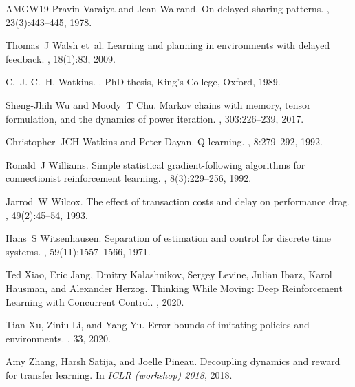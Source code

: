 \begin{thebibliography}{AMGW{\etalchar{+}}19}
Pravin Varaiya and Jean Walrand.
\newblock On delayed sharing patterns.
, 23(3):443--445, 1978.

Thomas~J Walsh et~al.
\newblock Learning and planning in environments with delayed feedback.
, 18(1):83, 2009.

C.~J. C.~H. Watkins.
.
\newblock PhD thesis, King's College, Oxford, 1989.

Sheng-Jhih Wu and Moody~T Chu.
\newblock Markov chains with memory, tensor formulation, and the dynamics of power iteration.
, 303:226--239, 2017.

Christopher~JCH Watkins and Peter Dayan.
\newblock Q-learning.
, 8:279--292, 1992.

Ronald~J Williams.
\newblock Simple statistical gradient-following algorithms for connectionist reinforcement learning.
, 8(3):229--256, 1992.

Jarrod~W Wilcox.
\newblock The effect of transaction costs and delay on performance drag.
, 49(2):45--54, 1993.

Hans~S Witsenhausen.
\newblock Separation of estimation and control for discrete time systems.
, 59(11):1557--1566, 1971.

Ted Xiao, Eric Jang, Dmitry Kalashnikov, Sergey Levine, Julian Ibarz, Karol Hausman, and Alexander Herzog.
\newblock Thinking {While} {Moving}: Deep {Reinforcement} {Learning} with {Concurrent} {Control}.
, 2020.

Tian Xu, Ziniu Li, and Yang Yu.
\newblock Error bounds of imitating policies and environments.
, 33, 2020.

Amy Zhang, Harsh Satija, and Joelle Pineau.
\newblock Decoupling dynamics and reward for transfer learning.
\newblock In {\em ICLR (workshop) 2018}, 2018.

\end{thebibliography}
